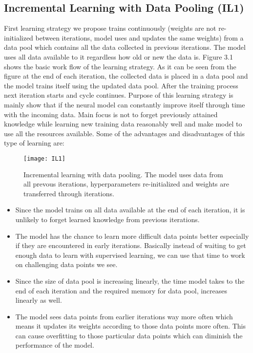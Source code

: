 \subsection{Incremental Learning with Data Pooling (IL1)}

First learning strategy we propose trains continuously (weights are not re-initialized between iterations, model uses and updates the same weights) from a data pool which contains all the data collected in previous iterations. The model uses all data available to it regardless how old or new the data is. Figure 3.1 shows the basic work flow of the learning strategy. As it can be seen from the figure at the end of each iteration, the collected data is placed in a data pool and the model trains itself using the updated data pool. After the training process next iteration starts and cycle continues. Purpose of this learning strategy is mainly show that if the neural model can constantly improve itself through time with the incoming data. Main focus is not to forget previously attained knowledge while learning new training data reasonably well and make model to use all the resources available. Some of the advantages and disadvantages of this type of learning are:

\begin{figure}[t]
\texttt{[image: IL1]}
\centering
\caption{Incremental learning with data pooling. The model uses data from all prevous iterations, hyperparameters re-initialized and weights are transferred through iterations.}
\end{figure}

\begin{itemize}

  \item Since the model trains on all data available at the end of each iteration, it is unlikely to forget learned knowledge from previous iterations.
  \item The model has the chance to learn more difficult data points better especially if they are encountered in early iterations. Basically instead of waiting to get enough data to learn with supervised learning, we can use that time to work on challenging data points we see.
  \item Since the size of data pool is increasing linearly, the time model takes to the end of each iteration and the required memory for data pool, increases linearly as well.
  \item The model sees data points from earlier iterations way more often which means it updates its weights according to those data points more often. This can cause overfitting to those particular data points which can diminish the performance of the model.

\end{itemize}

